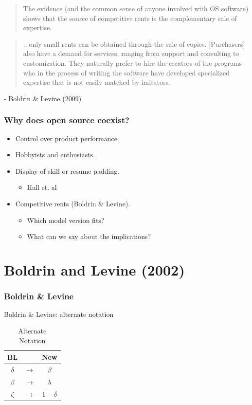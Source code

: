 \documentclass{beamer}
\begin{document}
\begin{frame}[t]
  \begin{quotation}
    The evidence (and the common sense of anyone involved with OS software) shows   that the source of competitive rents is the complementary sale of expertise.
  \end{quotation}
  \begin{quotation}
      ...only small rents can be obtained through the sale of copies. [Purchasers] also have a demand for services, ranging from support and consulting to customization. They naturally prefer to hire the creators of the programs who in the process of writing the software have developed specialized expertise that is not easily matched by imitators.
  \end{quotation}
  - Boldrin \& Levine (2009)
\end{frame}

\begin{frame}[t]
  \frametitle{Why does open source coexist?}
  \begin{itemize}
    \item<+-> Control over product performance.
    \item<+-> Hobbyists and enthusiasts.
    \item<+-> Display of skill or resume padding.
    \begin{itemize}
        \item<+-> Hall et. al
    \end{itemize}
    \item<+-> Competitive rents (Boldrin \& Levine).
    \begin{itemize}
        \item<+-> Which model version fits?
        \item<+-> What can we say about the implications?
    \end{itemize}
  \end{itemize}
\end{frame}

\section{Boldrin and Levine (2002)}
\label{sec:boldrin_and_levine_2002}

\begin{frame}
  \frametitle{Boldrin \& Levine}
  Boldrin \& Levine: alternate notation\\
  \begin{table}[ht]
    \caption{Alternate Notation}
    \centering
  \begin{tabular}{c c c}
    \hline\hline
      BL &  & New\\ [0.5ex] 
    \hline
    $\delta$ & $\longrightarrow$ & $\beta$  \\ 
    $\beta$ & $\longrightarrow$ & $\lambda$ \\
    $\zeta$ & $\longrightarrow$ & $1 - \delta$ \\[1ex] 
    \hline
   \end{tabular}
   \label{table:altnot}
  \end{table}
\end{frame}
\end{document}
